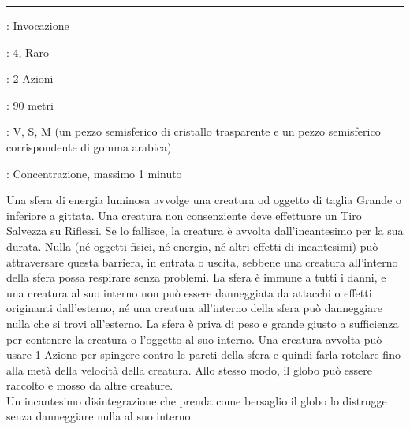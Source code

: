 \documentclass[a4paper,twoside,openany]{book}
\begin{document}
\begin{multicols}{2}
\smallskip\noindent\rule{\linewidth}{2pt} \hypertarget{Sfera Elastica}{}\medskip{}
\noindent
\begin{description}[noitemsep, topsep=0pt, parsep=0pt, partopsep=0pt, leftmargin=0cm, labelwidth=2.8cm]
	\item[\textbf{Lista di Magia}]: Invocazione
	\item[\textbf{Livello}]: 4, Raro
	\item[\textbf{Tempo di Lancio}]: 2 Azioni
	\item[\textbf{Gittata}]: 90 metri
	\item[\textbf{Componenti}]: V, S, M (un pezzo semisferico di cristallo trasparente e un pezzo semisferico corrispondente di gomma arabica)
	\item[\textbf{Durata}]: Concentrazione, massimo 1 minuto
\end{description}

Una sfera di energia luminosa avvolge una creatura od oggetto di taglia Grande o inferiore a gittata. Una creatura non consenziente deve effettuare un Tiro Salvezza su Riflessi. Se lo fallisce, la creatura è avvolta dall'incantesimo per la sua durata.
Nulla (né oggetti fisici, né energia, né altri effetti di incantesimi) può attraversare questa barriera, in entrata o uscita, sebbene una creatura all'interno della sfera possa respirare senza problemi. La sfera è immune a tutti i danni, e una creatura al suo interno non può essere danneggiata da attacchi o effetti originanti dall'esterno, né una creatura all'interno della sfera può danneggiare nulla che si trovi all'esterno. La sfera è priva di peso e grande giusto a sufficienza per contenere la creatura o l'oggetto al suo interno. Una creatura avvolta può usare 1 Azione per spingere contro le pareti della sfera e quindi farla rotolare fino alla metà della velocità della creatura. Allo stesso modo, il globo può essere raccolto e mosso da altre creature.\\
Un incantesimo disintegrazione che prenda come bersaglio il globo lo distrugge senza danneggiare nulla al suo interno.


\end{multicols}
\end{document}
